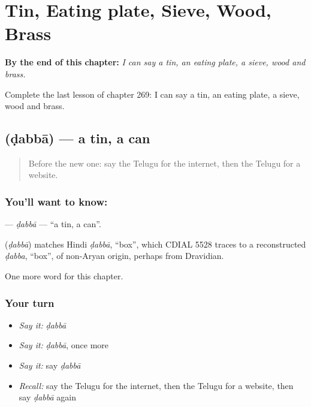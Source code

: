 
\chapter{Tin, Eating plate, Sieve, Wood, Brass}
\label{ch:te-tin-eating-plate-sieve-wood-brass}

\begin{chapteropening}
\textbf{By the end of this chapter:} \emph{I can say a tin, an eating plate, a sieve, wood and brass.}

Complete the last lesson of chapter 269: I can say a tin, an eating plate, a sieve, wood and brass.
\end{chapteropening}

\section[\texorpdfstring{\te{డబ్బా} (ḍabbā)}{డబ్బా (ḍabbā)}]{ (ḍabbā) — a tin, a can}

\label{lesson:TE-C269-dabba}



\begin{quote}
Before the new one: say the Telugu for the internet, then the Telugu for a website.
\end{quote}

\subsection*{You'll want to know: }
\textbf{} — \emph{ḍabbā} — \textquotedblleft{}a tin, a can\textquotedblright{}.

\begin{cousinweb}
\textbf{} (\emph{ḍabbā}) matches Hindi \emph{ḍabbā}, \textquotedblleft{}box\textquotedblright{}, which CDIAL 5528 traces to a reconstructed \emph{ḍabba}, \textquotedblleft{}box\textquotedblright{}, of non-Aryan origin, perhaps from Dravidian.
\end{cousinweb}

\begin{grammarlens}[title={What you've built}]
One more word for this chapter.
\end{grammarlens}

\subsection*{Your turn}
\begin{itemize}
\raggedright
  \item \emph{Say it:} \emph{ḍabbā}
  \item \emph{Say it:} \emph{ḍabbā}, once more
  \item \emph{Say it:} say \emph{ḍabbā}
  \item \emph{Recall:} say the Telugu for the internet, then the Telugu for a website, then say \emph{ḍabbā} again
\end{itemize}

